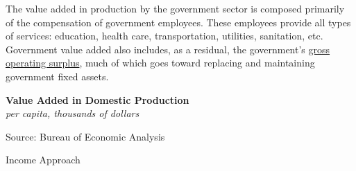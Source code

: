 \documentclass{report}
\makeatletter
\newcommand{\tbllink}[1]{\href{https://raw.githubusercontent.com/bdecon/US-chartbook/master/chartbook/data/#1}{\faTable}}
\newcommand*\short[1]{\expandafter\@gobbletwo\number\numexpr#1\relax}
\newcommand{\stdnode}[3]{\node[below, align=left, shift=({#1,#2})]{#3};}
\newcommand{\absnode}[3]{\node[below right, align=left] at (axis cs: #1,#2) {#3};}
\newcommand{\shdateaxisticks}{
		date coordinates in=x, axis line style={draw=none},
		xmax={2024-07-31},
		max space between ticks=40,	    
		xtick={{1990-01-01}, {1995-01-01}, {2000-01-01}, 
			{2005-01-01}, {2010-01-01}, {2015-01-01}, {2020-01-01}},
		minor xtick={},
		enlarge y limits={0.06}, enlarge x limits={0.01},
		xticklabel style={align=center, yshift=-2pt}, tick label style={inner sep=0pt},
		}
\newcommand{\bbar}[2]{extra #1 ticks = {{#2}}, extra #1 tick labels = ,
		extra #1 tick style = {grid=major, grid style={thick, black!25}},}
\newcommand{\stdline}[4]{\addplot[very thick, no markers, color=#1] 
		table [x=#2, y=#3, col sep=comma] {#4};	}
\newcommand{\rebars}{
		\fill[color=black!10] (axis cs:{2007-12-01},\pgfkeysvalueof{/pgfplots/ymin}) 
			rectangle (axis cs:{2009-07-01}, \pgfkeysvalueof{/pgfplots/ymax});
		\fill[color=black!10] (axis cs:{2001-03-01},\pgfkeysvalueof{/pgfplots/ymin}) 
			rectangle (axis cs:{2001-11-01}, \pgfkeysvalueof{/pgfplots/ymax});
		\fill[color=black!10] (axis cs:{2020-02-01},\pgfkeysvalueof{/pgfplots/ymin}) 
			rectangle (axis cs:{2020-05-01}, \pgfkeysvalueof{/pgfplots/ymax});}
\makeatother
\begin{document}
{\begin{minipage}{0.76\textwidth}
\small The value added in production by the government sector is composed primarily of the compensation of government employees. These employees provide all types of services: education, health care, transportation, utilities, sanitation, etc. Government value added also includes, as a residual, the government's \href{https://www.bea.gov/help/glossary/gross-operating-surplus}{gross operating surplus}, much of which goes toward replacing and maintaining government fixed assets. 
\end{minipage}
\vspace{1mm}

\begin{minipage}{0.375\textwidth}
\normalsize \textbf{Value Added in Domestic Production}\\
\footnotesize{\textit{per capita, thousands of dollars}}
\vspace{3.0cm}

\hspace{1mm} 

\footnotesize{Source: Bureau of Economic Analysis} \hfill \tbllink{gdpva_pc.csv}
\end{minipage} \hspace{4mm}
\begin{minipage}{0.35\textwidth}
\small 
\end{minipage}
\newpage
{}
\begin{minipage}{0.76\textwidth}    
\normalsize Income Approach
\vspace{-1mm}


\end{minipage}}
\end{document}
